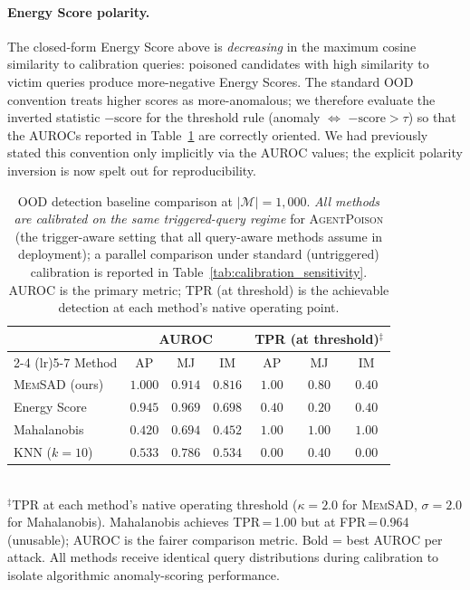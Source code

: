 \documentclass{article}
\theoremstyle{definition}
\newcommand{\cM}{\mathcal{M}}
\newcommand{\memsad}{\textnormal{\textsc{MemSAD}}}
\newcommand{\agentpoison}{\textsc{AgentPoison}}
\begin{document}
\paragraph{Energy Score polarity.} The closed-form Energy Score above is \emph{decreasing} in the maximum cosine similarity to calibration queries: poisoned candidates with high similarity to victim queries produce more-negative Energy Scores. The standard OOD convention treats higher scores as more-anomalous; we therefore evaluate the inverted statistic $-\text{score}$ for the threshold rule (anomaly $\Leftrightarrow$ $-\text{score} > \tau$) so that the AUROCs reported in Table~\ref{tab:ood_comparison} are correctly oriented. We had previously stated this convention only implicitly via the AUROC values; the explicit polarity inversion is now spelt out for reproducibility.

\begin{table}[ht]
  \centering
  \small
  \caption{OOD detection baseline comparison at $|\cM|=1{,}000$.
  \emph{All methods are calibrated on the same triggered-query regime} for \agentpoison{} (the trigger-aware setting that all query-aware methods assume in deployment); a parallel comparison under standard (untriggered) calibration is reported in Table~\ref{tab:calibration_sensitivity}. AUROC is the primary metric; TPR (at threshold) is the achievable detection at each method's native operating point.}
  \label{tab:ood_comparison}
  \begin{tabular}{l ccc ccc}
    \toprule
    & \multicolumn{3}{c}{AUROC} & \multicolumn{3}{c}{TPR (at threshold)$^\ddagger$} \\
    \cmidrule(lr){2-4} \cmidrule(lr){5-7}
    Method & AP & MJ & IM & AP & MJ & IM \\
    \midrule
    \memsad{} (ours) & $\mathbf{1.000}$ & $0.914$ & $\mathbf{0.816}$ & $\mathbf{1.00}$ & $0.80$ & $0.40$ \\
    Energy Score & $0.945$ & $\mathbf{0.969}$ & $0.698$ & $0.40$ & $0.20$ & $0.40$ \\
    Mahalanobis & $0.420$ & $0.694$ & $0.452$ & $1.00$ & $1.00$ & $1.00$ \\
    KNN ($k=10$) & $0.533$ & $0.786$ & $0.534$ & $0.00$ & $0.40$ & $0.00$ \\
    \bottomrule
  \end{tabular}
  \\[2pt]
  {\footnotesize $^\ddagger$TPR at each method's native operating threshold ($\kappa=2.0$ for \memsad{}, $\sigma=2.0$ for Mahalanobis). Mahalanobis achieves TPR\,=\,1.00 but at FPR\,=\,0.964 (unusable); AUROC is the fairer comparison metric. Bold = best AUROC per attack. All methods receive identical query distributions during calibration to isolate algorithmic anomaly-scoring performance.}
\end{table}
\end{document}

